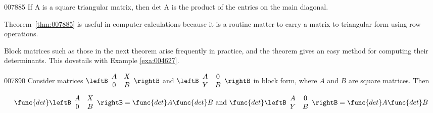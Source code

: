 \begin{theorem}{}{007885}
If A is a square triangular matrix, then det A is the product of the entries on the main diagonal.
\end{theorem}

\noindent Theorem~\ref{thm:007885} is useful in computer calculations because it is a routine matter to carry a matrix to triangular form using row operations.

Block matrices such as those in the 
next theorem arise frequently in practice, and the theorem gives an easy
 method for computing their determinants. This dovetails with Example \ref{exa:004627}.

\begin{theorem}{}{007890}
Consider matrices 
$\leftB \begin{array}{cc}
A & X \\
0 & B 
\end{array} \rightB$
and $\leftB \begin{array}{cc}
A & 0 \\
Y & B 
\end{array} \rightB$ in block form, where $A$ and $B$ are square matrices. Then
\begin{equation*}
\func{det} \leftB \begin{array}{cc}
A & X \\
0 & B 
\end{array}\rightB = \func{det } A \func{det } B \mbox{ and }
\func{det} \leftB \begin{array}{cc}
A & 0 \\
Y & B 
\end{array}\rightB = \func{det } A \func{det } B
\end{equation*}
\end{theorem}

